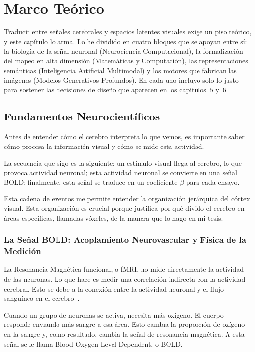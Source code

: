 \chapter{Marco Teórico}

Traducir entre señales cerebrales y espacios latentes visuales exige un piso teórico, y este 
capítulo lo arma. Lo he dividido en cuatro bloques que se apoyan entre sí: la biología de la 
señal neuronal (Neurociencia Computacional), la formalización del mapeo en alta dimensión 
(Matemáticas y Computación), las representaciones semánticas 
(Inteligencia Artificial Multimodal) y los motores que fabrican las imágenes 
(Modelos Generativos Profundos). En cada uno incluyo solo lo justo para sostener las decisiones 
de diseño que aparecen en los capítulos~5 y~6.

\section{Fundamentos Neurocientíficos}

Antes de entender cómo el cerebro interpreta lo que vemos, es importante saber cómo procesa la información visual y cómo se mide esta actividad.

La secuencia que sigo es la siguiente: un estímulo visual llega al cerebro, lo que provoca actividad neuronal; esta actividad neuronal se convierte en una señal BOLD; finalmente, esta señal se traduce en un coeficiente $\beta$ para cada ensayo.

Esta cadena de eventos me permite entender la organización jerárquica del córtex visual. Esta organización es crucial porque justifica por qué divido el cerebro en áreas específicas, llamadas vóxeles, de la manera que lo hago en mi tesis.


\subsection{La Señal BOLD: Acoplamiento Neurovascular y Física de la Medición}

La Resonancia Magnética funcional, o fMRI, no mide directamente la actividad de las neuronas. 
Lo que hace es medir una correlación indirecta con la actividad cerebral. Esto se debe a la conexión 
entre la actividad neuronal y el flujo sanguíneo en el cerebro~\cite{ogawa1990brain,logothetis2001neurophysiological,logothetis2008what}.

Cuando un grupo de neuronas se activa, necesita más oxígeno. El cuerpo responde enviando más sangre 
a esa área. Esto cambia la proporción de oxígeno en la sangre y, como resultado, cambia la señal de 
resonancia magnética. A esta señal se le llama Blood-Oxygen-Level-Dependent, o BOLD.

